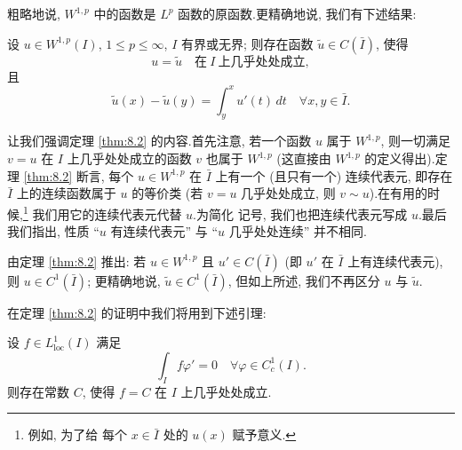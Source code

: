 粗略地说, $W^{1,p}$ 中的函数是 $L^p$ 函数的原函数.更精确地说, 我们有下述结果:

\begin{theorem}
\label{thm:8.2}
设 $u\in W^{1,p}(I)$, $1\le p\le\infty$, $I$ 有界或无界; 则存在函数
$\tilde u\in C(\bar I)$, 使得
\begin{equation*}
u=\tilde u\quad\text{在}\ I\ \text{上几乎处处成立},
\end{equation*}
且
\begin{equation*}
\tilde u(x)-\tilde u(y)=\int_y^x u'(t)\,dt\quad\forall x,y\in\bar I.
\end{equation*}
\end{theorem}

\begin{remark}
\label{rem:8.5}
让我们强调定理  \ref{thm:8.2} 的内容.首先注意, 若一个函数 $u$ 属于 $W^{1,p}$,
则一切满足 $v=u$ 在 $I$ 上几乎处处成立的函数 $v$ 也属于 $W^{1,p}$ (这直接由
$W^{1,p}$ 的定义得出).定理  \ref{thm:8.2} 断言, 每个 $u\in W^{1,p}$ 在 $\bar I$
上有一个 (且只有一个) 连续代表元, 即存在 $\bar I$ 上的连续函数属于 $u$ 的等价类
(若 $v=u$ 几乎处处成立, 则 $v\sim u$).在有用的时候,\footnote{例如, 为了给
每个 $x\in\bar I$ 处的 $u(x)$ 赋予意义.} 我们用它的连续代表元代替 $u$.为简化
记号, 我们也把连续代表元写成 $u$.最后我们指出, 性质 ``$u$ 有连续代表元'' 与
``$u$ 几乎处处连续'' 并不相同.
\end{remark}

\begin{remark}
\label{rem:8.6}
由定理  \ref{thm:8.2} 推出: 若 $u\in W^{1,p}$ 且 $u'\in C(\bar I)$ (即 $u'$ 在
$\bar I$ 上有连续代表元), 则 $u\in C^1(\bar I)$; 更精确地说,
$\tilde u\in C^1(\bar I)$, 但如上所述, 我们不再区分 $u$ 与 $\tilde u$.
\end{remark}

在定理  \ref{thm:8.2} 的证明中我们将用到下述引理:

\begin{lemma}
\label{lem:8.1}
设 $f\in L^1_{\mathrm{loc}}(I)$ 满足
\begin{equation}
\int_I f\varphi'=0\quad\forall\varphi\in C_c^1(I).
\label{eq:8.3}
\end{equation}
则存在常数 $C$, 使得 $f=C$ 在 $I$ 上几乎处处成立.
\end{lemma}

